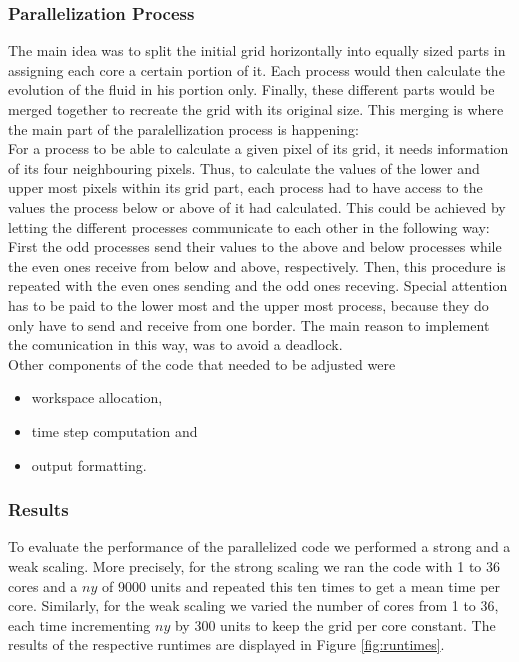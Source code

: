 \documentclass[12pt, a4paper, titlepage]{article}
\newcommand{\vp}{\vspace{1cm}}
\begin{document}
{\vp
\subsubsection{Parallelization Process}
The main idea was to split the initial grid horizontally into equally sized parts in assigning each core a certain portion of it. Each process would then calculate the evolution of the fluid in his portion only. Finally, these different parts would be merged together to recreate the grid with its original size. This merging is where the main part of the paralellization process is happening:\\
For a process to be able to calculate a given pixel of its grid, it needs information of its four neighbouring pixels. Thus, to calculate the values of the lower and upper most pixels within its grid part, each process had to have access to the values the process below or above of it had calculated. This could be achieved by letting the different processes communicate to each other in the following way:\\
First the odd processes send their values to the above and below processes while the even ones receive from below and above, respectively. Then, this procedure is repeated with the even ones sending and the odd ones receving. Special attention has to be paid to the lower most and the upper most process, because they do only have to send and receive from one border. The main reason to implement the comunication in this way, was to avoid a deadlock.\\
Other components of the code that needed to be adjusted were

\begin{itemize}
\item workspace allocation,
\item time step computation and
\item output formatting.
\end{itemize} 


\subsubsection{Results}
To evaluate the performance of the parallelized code we performed a strong and a weak scaling. More precisely, for the strong scaling we ran the code with 1 to 36 cores and a $ny$ of 9000 units and repeated this ten times to get a mean time per core. Similarly, for the weak scaling we varied the number of cores from 1 to 36, each time incrementing $ny$ by 300 units to keep the grid per core constant. The results of the respective runtimes are displayed in Figure \ref{fig:runtimes}.

}
\end{document}
